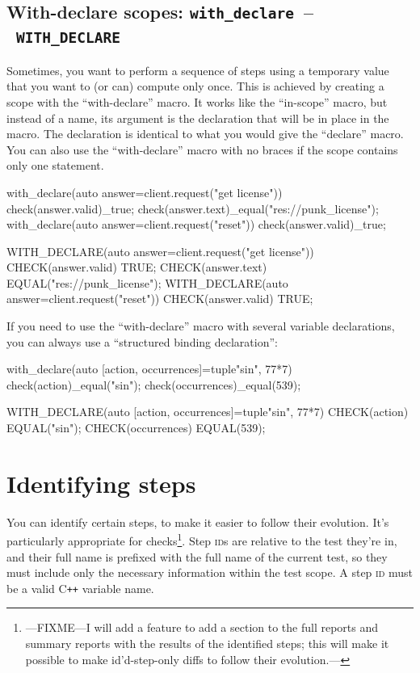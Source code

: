 \documentclass[twoside, a4paper, article]{memoir}
\newcommand*\testudocolor{\color{red!80!blue}}
\newcommand*\testudo[1]{\texttt{\testudocolor{}#1}}
\newcommand*\testudopair[2]{\testudo{#1}~--~\testudo{#2}}
\newcommand\subsectiontestudopair[3]{%
  \subsection[#1]{#1: \testudopair{#2}{#3}}}
\newcommand*\Cpp{C\texttt{++}}
\begin{document}
\subsectiontestudopair{With-declare scopes}{with\_declare}{WITH\_DECLARE}
\label{sec:with-declare-scopes}

Sometimes, you want to perform a sequence of steps using a temporary value that
you want to (or can) compute only once.  This is achieved by creating a scope
with the ``with-declare'' macro.  It works like the ``in-scope'' macro, but
instead of a name, its argument is the declaration that will be in place in the
macro.  The declaration is identical to what you would give the ``declare''
macro.  You can also use the ``with-declare'' macro with no braces if the scope
contains only one statement.

\begin{cpplisting}
with_declare(auto answer=client.request("get license")) {
  check(answer.valid)_true;
  check(answer.text)_equal("res://punk_license");
}
with_declare(auto answer=client.request("reset"))
  check(answer.valid)_true;
\end{cpplisting}

\begin{cpplisting}
WITH_DECLARE(auto answer=client.request("get license"))
{
  CHECK(answer.valid) TRUE;
  CHECK(answer.text) EQUAL("res://punk_license");
}
WITH_DECLARE(auto answer=client.request("reset"))
  CHECK(answer.valid) TRUE;
\end{cpplisting}

If you need to use the ``with-declare'' macro with several variable
declarations, you can always use a ``structured binding declaration'':
\begin{cpplisting}
with_declare(auto [action, occurrences]=tuple{"sin", 77*7}) {
  check(action)_equal("sin");
  check(occurrences)_equal(539);
}
\end{cpplisting}

\begin{cpplisting}
WITH_DECLARE(auto [action, occurrences]=tuple{"sin", 77*7})
{
  CHECK(action) EQUAL("sin");
  CHECK(occurrences) EQUAL(539);
}
\end{cpplisting}

\section{Identifying steps}
\label{sec:identifying-steps}

You can identify certain steps, to make it easier to follow their evolution.
It's particularly appropriate for checks\footnote{---FIXME---I will add a
  feature to add a section to the full reports and summary reports with the
  results of the identified steps; this will make it possible to make
  id'd-step-only diffs to follow their evolution.---}.  Step \textsc{id}s are
relative to the test they're in, and their full name is prefixed with the full
name of the current test, so they must include only the necessary information
within the test scope.  A step \textsc{id} must be a valid \Cpp{} variable
name.
\end{document}

